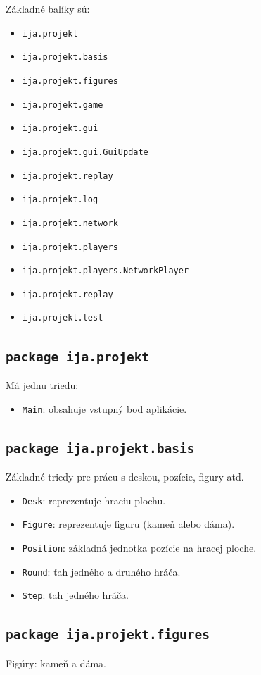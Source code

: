 \documentclass[12pt,a4paper,titlepage,final]{article}
\begin{document}
Základné balíky sú:
\begin{itemize}
\item \texttt{ija.projekt}
\item \texttt{ija.projekt.basis}
\item \texttt{ija.projekt.figures}
\item \texttt{ija.projekt.game}
\item \texttt{ija.projekt.gui}
\item \texttt{ija.projekt.gui.GuiUpdate}
\item \texttt{ija.projekt.replay}
\item \texttt{ija.projekt.log}
\item \texttt{ija.projekt.network}
\item \texttt{ija.projekt.players}
\item \texttt{ija.projekt.players.NetworkPlayer}
\item \texttt{ija.projekt.replay}
\item \texttt{ija.projekt.test}
\end{itemize}

\subsection{\texttt{package ija.projekt}}
Má jednu triedu:

\begin{itemize}
\item \texttt{Main}: obsahuje vstupný bod aplikácie.
\end{itemize}

\subsection{\texttt{package ija.projekt.basis}}
Základné triedy pre prácu s deskou, pozície, figury atď.

\begin{itemize}
\item \texttt{Desk}: reprezentuje hraciu plochu.
\item \texttt{Figure}: reprezentuje figuru (kameň alebo dáma).
\item \texttt{Position}: základná jednotka pozície na hracej ploche.
\item \texttt{Round}: ťah jedného a druhého hráča.
\item \texttt{Step}: ťah jedného hráča.
\end{itemize}

\subsection{\texttt{package ija.projekt.figures}}
Figúry: kameň a dáma.
\end{document}
